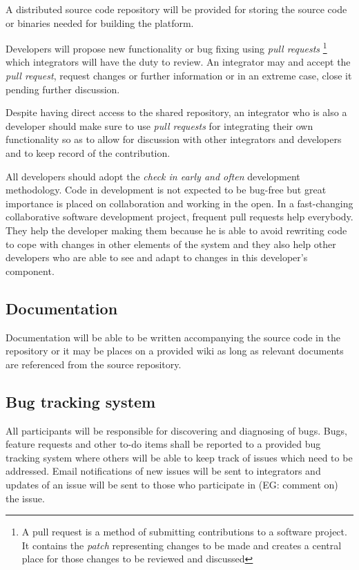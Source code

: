 A distributed source code repository will be provided for storing the source code or binaries
needed for building the \learnpad platform.

Developers will propose new functionality or bug fixing using \emph{pull requests}
\footnote{A pull request is a method of submitting contributions to a software project.
It contains the \emph{patch} representing changes to be made and creates a central place
for those changes to be reviewed and discussed}
which integrators will have the duty to review. An integrator may and accept the
\emph{pull request}, request changes or further information or in an extreme case,
close it pending further discussion.

Despite having direct access to the shared repository, an integrator who is also a developer should
make sure to use \emph{pull requests} for integrating their own functionality so as to allow for
discussion with other integrators and developers and to keep record of the contribution.

All developers should adopt the \emph{check in early and often} development methodology.
Code in development is not expected to be bug-free but great importance is placed on collaboration
and working in the open. In a fast-changing collaborative software development project, frequent
pull requests help everybody. They help the developer making them because he is able to avoid
rewriting code to cope with changes in other elements of the system and they also help other
developers who are able to see and adapt to changes in this developer's component.

\subsection{Documentation}
\label{sec:documentation}

Documentation will be able to be written accompanying the source code in the repository or it
may be places on a provided wiki as long as relevant documents are referenced from the source
repository.

\subsection{Bug tracking system}
\label{sec:bug tracking-system}

All participants will be responsible for discovering and diagnosing of bugs. Bugs, feature
requests and other to-do items shall be reported to a provided bug tracking system where others
will be able to keep track of issues which need to be addressed. Email notifications of new
issues will be sent to integrators and updates of an issue will be sent to those who participate in
(EG: comment on) the issue.
